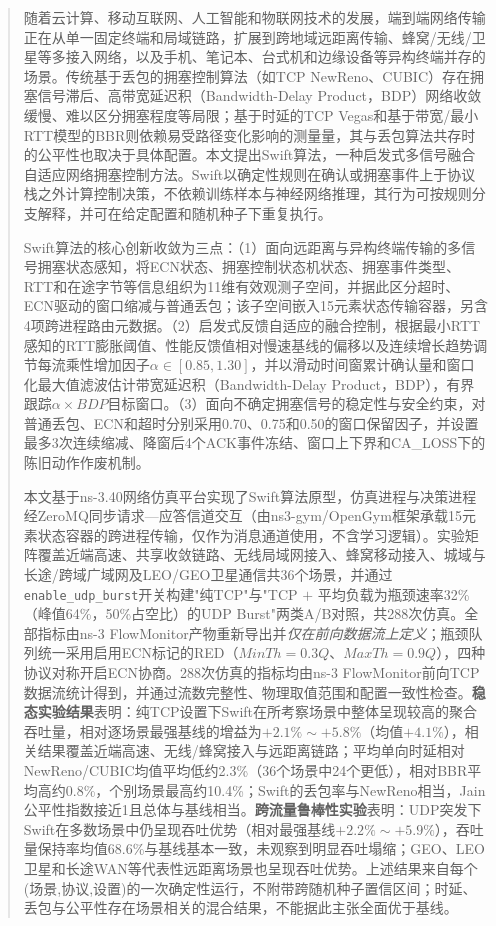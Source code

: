 \begin{abstract}
随着云计算、移动互联网、人工智能和物联网技术的发展，端到端网络传输正在从单一固定终端和局域链路，扩展到跨地域远距离传输、蜂窝/无线/卫星等多接入网络，以及手机、笔记本、台式机和边缘设备等异构终端并存的场景。传统基于丢包的拥塞控制算法（如TCP NewReno、CUBIC）存在拥塞信号滞后、高带宽延迟积（Bandwidth-Delay Product，BDP）网络收敛缓慢、难以区分拥塞程度等局限；基于时延的TCP Vegas和基于带宽/最小RTT模型的BBR则依赖易受路径变化影响的测量量，其与丢包算法共存时的公平性也取决于具体配置。本文提出Swift算法，一种启发式多信号融合自适应网络拥塞控制方法。Swift以确定性规则在确认或拥塞事件上于协议栈之外计算控制决策，不依赖训练样本与神经网络推理，其行为可按规则分支解释，并可在给定配置和随机种子下重复执行。

Swift算法的核心创新收敛为三点：（1）面向远距离与异构终端传输的多信号拥塞状态感知，将ECN状态、拥塞控制状态机状态、拥塞事件类型、RTT和在途字节等信息组织为11维有效观测子空间，并据此区分超时、ECN驱动的窗口缩减与普通丢包；该子空间嵌入15元素状态传输容器，另含4项跨进程路由元数据。（2）启发式反馈自适应的融合控制，根据最小RTT感知的RTT膨胀阈值、性能反馈值相对慢速基线的偏移以及连续增长趋势调节每流乘性增加因子$\alpha\in[0.85,1.30]$，并以滑动时间窗累计确认量和窗口化最大值滤波估计带宽延迟积（Bandwidth-Delay Product，BDP），有界跟踪$\alpha\times BDP$目标窗口。（3）面向不确定拥塞信号的稳定性与安全约束，对普通丢包、ECN和超时分别采用0.70、0.75和0.50的窗口保留因子，并设置最多3次连续缩减、降窗后4个ACK事件冻结、窗口上下界和CA\_LOSS下的陈旧动作作废机制。

本文基于ns-3.40网络仿真平台实现了Swift算法原型，仿真进程与决策进程经ZeroMQ同步请求—应答信道交互（由ns3-gym/OpenGym框架承载15元素状态容器的跨进程传输，仅作为消息通道使用，不含学习逻辑）。实验矩阵覆盖近端高速、共享收敛链路、无线局域网接入、蜂窝移动接入、城域与长途/跨域广域网及LEO/GEO卫星通信共36个场景，并通过\texttt{enable\_udp\_burst}开关构建"纯TCP"与"TCP $+$ 平均负载为瓶颈速率32\%（峰值64\%，50\%占空比）的UDP Burst"两类A/B对照，共288次仿真。全部指标由ns-3 FlowMonitor产物重新导出并\emph{仅在前向数据流上定义}；瓶颈队列统一采用启用ECN标记的RED（$MinTh=0.3Q$、$MaxTh=0.9Q$），四种协议对称开启ECN协商。288次仿真的指标均由ns-3 FlowMonitor前向TCP数据流统计得到，并通过流数完整性、物理取值范围和配置一致性检查。\textbf{稳态实验结果}表明：纯TCP设置下Swift在所考察场景中整体呈现较高的聚合吞吐量，相对逐场景最强基线的增益为$+2.1\%\sim+5.8\%$（均值$+4.1\%$），相关结果覆盖近端高速、无线/蜂窝接入与远距离链路；平均单向时延相对NewReno/CUBIC均值平均低约2.3\%（36个场景中24个更低），相对BBR平均高约0.8\%，个别场景最高约10.4\%；Swift的丢包率与NewReno相当，Jain公平性指数接近1且总体与基线相当。\textbf{跨流量鲁棒性实验}表明：UDP突发下Swift在多数场景中仍呈现吞吐优势（相对最强基线$+2.2\%\sim+5.9\%$），吞吐量保持率均值68.6\%与基线基本一致，未观察到明显吞吐塌缩；GEO、LEO卫星和长途WAN等代表性远距离场景也呈现吞吐优势。上述结果来自每个(场景,协议,设置)的一次确定性运行，不附带跨随机种子置信区间；时延、丢包与公平性存在场景相关的混合结果，不能据此主张全面优于基线。

\end{abstract}


